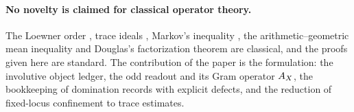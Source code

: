 \paragraph{No novelty is claimed for classical operator theory.}
The Loewner order \citep{Loewner1934,Bhatia1997,HornJohnson2013},
trace ideals \citep{Simon2005,ReedSimon1980}, Markov's inequality
\citep{Folland1999}, the arithmetic--geometric mean inequality
\citep{HardyLittlewoodPolya1952} and Douglas's factorization theorem
\citep{Douglas1966} are classical, and the proofs given here are
standard.  The contribution of the paper is the formulation: the
involutive object ledger, the odd readout and its Gram operator
\(A_{X}\), the bookkeeping of domination records with explicit defects,
and the reduction of fixed-locus confinement to trace estimates.
